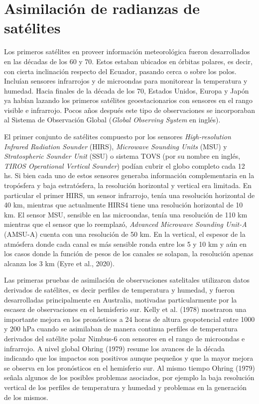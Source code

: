 \documentclass[12pt,oneside,a4paper]{reedthesis}
\begin{document}
\hypertarget{asim-rad}{%
\section{Asimilación de radianzas de satélites}\label{asim-rad}}

Los primeros satélites en proveer información meteorológica fueron desarrollados en las décadas de los 60 y 70. Estos estaban ubicados en órbitas polares, es decir, con cierta inclinación respecto del Ecuador, pasando cerca o sobre los polos. Incluían sensores infrarrojos y de microondas para monitorear la temperatura y humedad. Hacia finales de la década de los 70, Estados Unidos, Europa y Japón ya habían lazando los primeros satélites geoestacionarios con sensores en el rango visible e infrarrojo. Pocos años después este tipo de observaciones se incorporaban al Sistema de Observación Global (\emph{Global Observing System} en inglés).

El primer conjunto de satélites compuesto por los sensores \emph{High-resolution Infrared Radiation Sounder} (HIRS), \emph{Microwave Sounding Units} (MSU) y \emph{Stratospheric Sounder Unit} (SSU) o sistema TOVS (por su nombre en inglés, \emph{TIROS Operational Vertical Sounder}) podían cubrir el globo completo cada 12 hs. Si bien cada uno de estos sensores generaba información complementaria en la tropósfera y baja estratósfera, la resolución horizontal y vertical era limitada. En particular el primer HIRS, un sensor infrarrojo, tenía una resolución horizontal de 40 km, mientras que actualmente HIRS4 tiene una resolución horizontal de 10 km. El sensor MSU, sensible en las microondas, tenía una resolución de 110 km mientras que el sensor que lo reemplazó, \emph{Advanced Microwave Sounding Unit-A} (AMSU-A) cuenta con una resolución de 50 km. En la vertical, el espesor de la atmósfera donde cada canal es más sensible ronda entre los 5 y 10 km y aún en los casos donde la función de pesos de los canales se solapan, la resolución apenas alcanza los 3 km (Eyre et al., 2020).

Las primeras pruebas de asimilación de observaciones satelitales utilizaron datos derivados de satélites, es decir perfiles de temperatura y humedad, y fueron desarrolladas principalmente en Australia, motivadas particularmente por la escasez de observaciones en el hemisferio sur. Kelly et al. (1978) mostraron una importante mejora en los pronósticos a 24 horas de altura geopotencial entre 1000 y 200 hPa cuando se asimilaban de manera continua perfiles de temperatura derivados del satélite polar Nimbus-6 con sensores en el rango de microondas e infrarrojo. A nivel global Ohring (1979) resume los avances de la década indicando que los impactos son positivos aunque pequeños y que la mayor mejora se observa en los pronósticos en el hemisferio sur. Al mismo tiempo Ohring (1979) señala algunos de los posibles problemas asociados, por ejemplo la baja resolución vertical de los perfiles de temperatura y humedad y problemas en la generación de los mismos.
\end{document}
